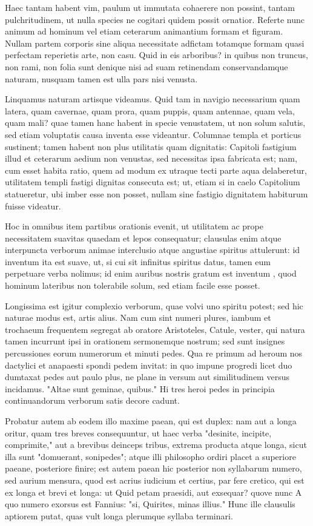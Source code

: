  Haec tantam habent vim, paulum ut immutata cohaerere non possint, tantam pulchritudinem, ut nulla species ne cogitari quidem possit ornatior. Referte nunc animum ad hominum vel etiam ceterarum animantium formam et figuram. Nullam partem corporis sine aliqua necessitate adfictam totamque formam quasi perfectam reperietis arte, non casu. Quid in eis arboribus? in quibus non truncus, non rami, non folia sunt denique nisi ad suam retinendam conservandamque naturam, nusquam tamen est ulla pars nisi venusta.

 Linquamus naturam artisque videamus. Quid tam in navigio necessarium quam latera, quam cavernae, quam prora, quam puppis, quam antennae, quam vela, quam mali? quae tamen hanc habent in specie venustatem, ut non solum salutis, sed etiam voluptatis causa inventa esse videantur. Columnae templa et porticus sustinent; tamen habent non plus utilitatis quam dignitatis: Capitoli fastigium illud et ceterarum aedium non venustas, sed necessitas ipsa fabricata est; nam, cum esset habita ratio, quem ad modum ex utraque tecti parte aqua delaberetur, utilitatem templi fastigi dignitas consecuta est; ut, etiam si in caelo Capitolium statueretur, ubi imber esse non posset, nullam sine fastigio dignitatem habiturum fuisse videatur.

 Hoc in omnibus item partibus orationis evenit, ut utilitatem ac prope necessitatem suavitas quaedam et lepos consequatur; clausulas enim atque interpuncta verborum animae interclusio atque angustiae spiritus attulerunt: id inventum ita est suave, ut, si cui sit infinitus spiritus datus, tamen eum perpetuare verba nolimus; id enim auribus nostris gratum est inventum , quod hominum lateribus non tolerabile solum, sed etiam facile esse posset.

 Longissima est igitur complexio verborum, quae volvi uno spiritu potest; sed hic naturae modus est, artis alius. Nam cum sint numeri plures, iambum et trochaeum frequentem segregat ab oratore Aristoteles, Catule, vester, qui natura tamen incurrunt ipsi in orationem sermonemque nostrum; sed sunt insignes percussiones eorum numerorum et minuti pedes. Qua re primum ad heroum nos dactylici et anapaesti spondi pedem invitat: in quo impune progredi licet duo dumtaxat pedes aut paulo plus, ne plane in versum aut similitudinem versus incidamus. "Altae sunt geminae, quibus." Hi tres heroi pedes in principia continuandorum verborum satis decore cadunt.

 Probatur autem ab eodem illo maxime paean, qui est duplex: nam aut a longa oritur, quam tres breves consequuntur, ut haec verba "desinite, incipite, comprimite," aut a brevibus deinceps tribus, extrema producta atque longa, sicut illa sunt "domuerant, sonipedes"; atque illi philosopho ordiri placet a superiore paeane, posteriore finire; est autem paean hic posterior non syllabarum numero, sed aurium mensura, quod est acrius iudicium et certius, par fere cretico, qui est ex longa et brevi et longa: ut Quid petam praesidi, aut exsequar? quove nunc A quo numero exorsus est Fannius: "si, Quirites, minas illius." Hunc ille clausulis aptiorem putat, quas vult longa plerumque syllaba terminari.

